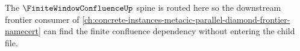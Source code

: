 The $\FiniteWindowConfluenceUp$ spine is routed here so the downstream frontier consumer of \autoref{ch:concrete-instances-metacic-parallel-diamond-frontier-namecert} can find the finite confluence dependency without entering the child file.

